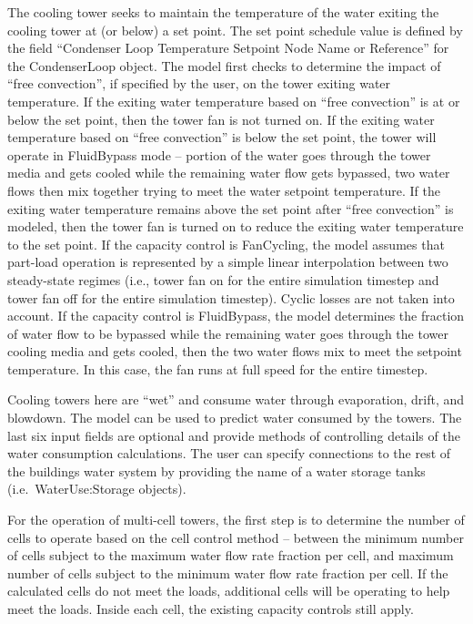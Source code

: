 The cooling tower seeks to maintain the temperature of the water exiting the cooling tower at (or below) a set point. The set point schedule value is defined by the field ``Condenser Loop Temperature Setpoint Node Name or Reference'' for the CondenserLoop object. The model first checks to determine the impact of ``free convection'', if specified by the user, on the tower exiting water temperature. If the exiting water temperature based on ``free convection'' is at or below the set point, then the tower fan is not turned on. If the exiting water temperature based on ``free convection'' is below the set point, the tower will operate in FluidBypass mode -- portion of the water goes through the tower media and gets cooled while the remaining water flow gets bypassed, two water flows then mix together trying to meet the water setpoint temperature. If the exiting water temperature remains above the set point after ``free convection'' is modeled, then the tower fan is turned on to reduce the exiting water temperature to the set point. If the capacity control is FanCycling, the model assumes that part-load operation is represented by a simple linear interpolation between two steady-state regimes (i.e., tower fan on for the entire simulation timestep and tower fan off for the entire simulation timestep). Cyclic losses are not taken into account. If the capacity control is FluidBypass, the model determines the fraction of water flow to be bypassed while the remaining water goes through the tower cooling media and gets cooled, then the two water flows mix to meet the setpoint temperature. In this case, the fan runs at full speed for the entire timestep.

Cooling towers here are ``wet'' and consume water through evaporation, drift, and blowdown. The model can be used to predict water consumed by the towers. The last six input fields are optional and provide methods of controlling details of the water consumption calculations. The user can specify connections to the rest of the buildings water system by providing the name of a water storage tanks (i.e.~WaterUse:Storage objects).

For the operation of multi-cell towers, the first step is to determine the number of cells to operate based on the cell control method -- between the minimum number of cells subject to the maximum water flow rate fraction per cell, and maximum number of cells subject to the minimum water flow rate fraction per cell. If the calculated cells do not meet the loads, additional cells will be operating to help meet the loads. Inside each cell, the existing capacity controls still apply.

